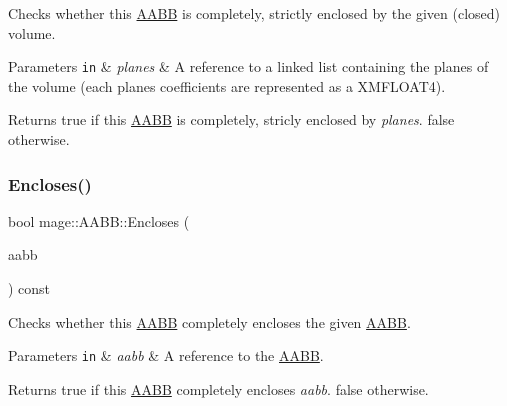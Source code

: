 Checks whether this \hyperlink{structmage_1_1_a_a_b_b}{A\+A\+BB} is completely, strictly enclosed by the given (closed) volume.


\begin{DoxyParams}[1]{Parameters}
\mbox{\tt in}  & {\em planes} & A reference to a linked list containing the planes of the volume (each plane\textquotesingle{}s coefficients are represented as a {\ttfamily X\+M\+F\+L\+O\+A\+T4}). \\
\hline
\end{DoxyParams}
\begin{DoxyReturn}{Returns}
{\ttfamily true} if this \hyperlink{structmage_1_1_a_a_b_b}{A\+A\+BB} is completely, stricly enclosed by {\itshape planes}. {\ttfamily false} otherwise. 
\end{DoxyReturn}
\hypertarget{structmage_1_1_a_a_b_b_a0d6619404376bacf956b4a0c6662696f}{}\label{structmage_1_1_a_a_b_b_a0d6619404376bacf956b4a0c6662696f} 
\subsubsection{\texorpdfstring{Encloses()}{Encloses()}\hspace{0.1cm}{\footnotesize\ttfamily [1/3]}}
{\footnotesize\ttfamily bool mage\+::\+A\+A\+B\+B\+::\+Encloses (\begin{DoxyParamCaption}\item[{const \hyperlink{structmage_1_1_a_a_b_b}{A\+A\+BB} \&}]{aabb }\end{DoxyParamCaption}) const}

Checks whether this \hyperlink{structmage_1_1_a_a_b_b}{A\+A\+BB} completely encloses the given \hyperlink{structmage_1_1_a_a_b_b}{A\+A\+BB}.


\begin{DoxyParams}[1]{Parameters}
\mbox{\tt in}  & {\em aabb} & A reference to the \hyperlink{structmage_1_1_a_a_b_b}{A\+A\+BB}. \\
\hline
\end{DoxyParams}
\begin{DoxyReturn}{Returns}
{\ttfamily true} if this \hyperlink{structmage_1_1_a_a_b_b}{A\+A\+BB} completely encloses {\itshape aabb}. {\ttfamily false} otherwise. 
\end{DoxyReturn}
\hypertarget{structmage_1_1_a_a_b_b_a67d1820b5ee787f02e6cfd593aca35fd}{}\label{structmage_1_1_a_a_b_b_a67d1820b5ee787f02e6cfd593aca35fd} 
